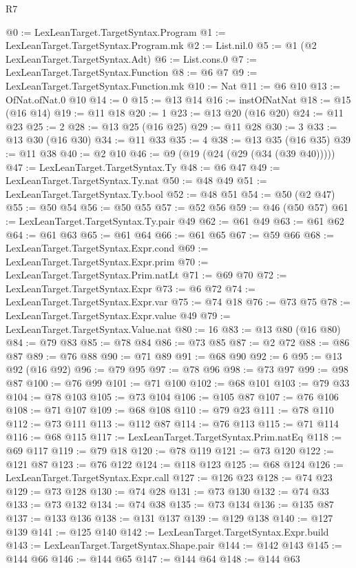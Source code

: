 \begin{lexlean}{R7}
\begin{coremodule}
@0 := LexLeanTarget.TargetSyntax.Program
@1 := LexLeanTarget.TargetSyntax.Program.mk
@2 := List.nil.{0}
@5 := @1 (@2 LexLeanTarget.TargetSyntax.Adt)
@6 := List.cons.{0}
@7 := LexLeanTarget.TargetSyntax.Function
@8 := @6 @7
@9 := LexLeanTarget.TargetSyntax.Function.mk
@10 := Nat
@11 := @6 @10
@13 := OfNat.ofNat.{0} @10
@14 := 0
@15 := @13 @14
@16 := instOfNatNat
@18 := @15 (@16 @14)
@19 := @11 @18
@20 := 1
@23 := @13 @20 (@16 @20)
@24 := @11 @23
@25 := 2
@28 := @13 @25 (@16 @25)
@29 := @11 @28
@30 := 3
@33 := @13 @30 (@16 @30)
@34 := @11 @33
@35 := 4
@38 := @13 @35 (@16 @35)
@39 := @11 @38
@40 := @2 @10
@46 := @9 (@19 (@24 (@29 (@34 (@39 @40)))))
@47 := LexLeanTarget.TargetSyntax.Ty
@48 := @6 @47
@49 := LexLeanTarget.TargetSyntax.Ty.nat
@50 := @48 @49
@51 := LexLeanTarget.TargetSyntax.Ty.bool
@52 := @48 @51
@54 := @50 (@2 @47)
@55 := @50 @54
@56 := @50 @55
@57 := @52 @56
@59 := @46 (@50 @57)
@61 := LexLeanTarget.TargetSyntax.Ty.pair @49
@62 := @61 @49
@63 := @61 @62
@64 := @61 @63
@65 := @61 @64
@66 := @61 @65
@67 := @59 @66
@68 := LexLeanTarget.TargetSyntax.Expr.cond
@69 := LexLeanTarget.TargetSyntax.Expr.prim
@70 := LexLeanTarget.TargetSyntax.Prim.natLt
@71 := @69 @70
@72 := LexLeanTarget.TargetSyntax.Expr
@73 := @6 @72
@74 := LexLeanTarget.TargetSyntax.Expr.var
@75 := @74 @18
@76 := @73 @75
@78 := LexLeanTarget.TargetSyntax.Expr.value @49
@79 := LexLeanTarget.TargetSyntax.Value.nat
@80 := 16
@83 := @13 @80 (@16 @80)
@84 := @79 @83
@85 := @78 @84
@86 := @73 @85
@87 := @2 @72
@88 := @86 @87
@89 := @76 @88
@90 := @71 @89
@91 := @68 @90
@92 := 6
@95 := @13 @92 (@16 @92)
@96 := @79 @95
@97 := @78 @96
@98 := @73 @97
@99 := @98 @87
@100 := @76 @99
@101 := @71 @100
@102 := @68 @101
@103 := @79 @33
@104 := @78 @103
@105 := @73 @104
@106 := @105 @87
@107 := @76 @106
@108 := @71 @107
@109 := @68 @108
@110 := @79 @23
@111 := @78 @110
@112 := @73 @111
@113 := @112 @87
@114 := @76 @113
@115 := @71 @114
@116 := @68 @115
@117 := LexLeanTarget.TargetSyntax.Prim.natEq
@118 := @69 @117
@119 := @79 @18
@120 := @78 @119
@121 := @73 @120
@122 := @121 @87
@123 := @76 @122
@124 := @118 @123
@125 := @68 @124
@126 := LexLeanTarget.TargetSyntax.Expr.call
@127 := @126 @23
@128 := @74 @23
@129 := @73 @128
@130 := @74 @28
@131 := @73 @130
@132 := @74 @33
@133 := @73 @132
@134 := @74 @38
@135 := @73 @134
@136 := @135 @87
@137 := @133 @136
@138 := @131 @137
@139 := @129 @138
@140 := @127 @139
@141 := @125 @140
@142 := LexLeanTarget.TargetSyntax.Expr.build
@143 := LexLeanTarget.TargetSyntax.Shape.pair
@144 := @142 @143
@145 := @144 @66
@146 := @144 @65
@147 := @144 @64
@148 := @144 @63

\end{coremodule}
\end{lexlean}
